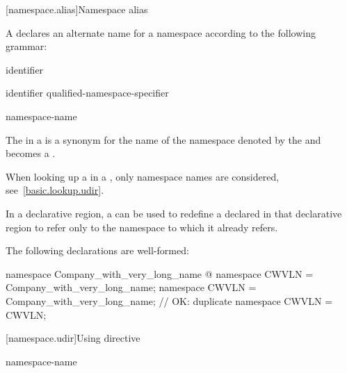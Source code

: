 [namespace.alias]{Namespace alias}%
%
%

\pnum
A  declares an alternate name for a
namespace according to the following grammar:

\begin{bnf}
\br
        identifier
\end{bnf}

\begin{bnf}
\br
         identifier \terminal{=} qualified-namespace-specifier \terminal{;}
\end{bnf}

\begin{bnf}
\br
     namespace-name
\end{bnf}

\pnum
The  in a  is
a synonym for the name of the namespace denoted by the
 and becomes a
.
\begin{note}
When looking up a  in a
, only namespace names are
considered, see~\ref{basic.lookup.udir}.
\end{note}

\pnum
In a declarative region, a  can be
used to redefine a  declared in that
declarative region to refer only to the namespace to which it already
refers.
\begin{example}
The following declarations are well-formed:

\begin{codeblock}
namespace Company_with_very_long_name { @\commentellip@ }
namespace CWVLN = Company_with_very_long_name;
namespace CWVLN = Company_with_very_long_name;  // OK: duplicate
namespace CWVLN = CWVLN;
\end{codeblock}
\end{example}

[namespace.udir]{Using directive}%

\begin{bnf}
\br
       namespace-name \terminal{;}
\end{bnf}

